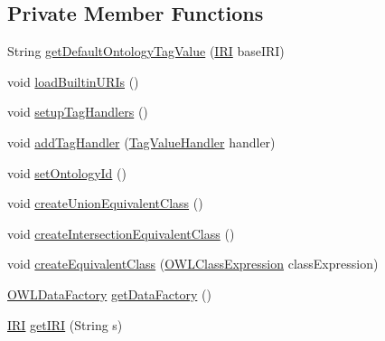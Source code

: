 \subsection*{Private Member Functions}
\begin{DoxyCompactItemize}
\item 
String \hyperlink{classorg_1_1coode_1_1owlapi_1_1obo_1_1parser_1_1_o_b_o_consumer_a778da28d999ef3418bc8a6edfb94684a}{get\-Default\-Ontology\-Tag\-Value} (\hyperlink{classorg_1_1semanticweb_1_1owlapi_1_1model_1_1_i_r_i}{I\-R\-I} base\-I\-R\-I)
\item 
void \hyperlink{classorg_1_1coode_1_1owlapi_1_1obo_1_1parser_1_1_o_b_o_consumer_ab49dd2aced1f66920170f474aa72d008}{load\-Builtin\-U\-R\-Is} ()
\item 
void \hyperlink{classorg_1_1coode_1_1owlapi_1_1obo_1_1parser_1_1_o_b_o_consumer_a14c95b9d7fd895a8048b2ee35b880ecb}{setup\-Tag\-Handlers} ()
\item 
void \hyperlink{classorg_1_1coode_1_1owlapi_1_1obo_1_1parser_1_1_o_b_o_consumer_a5700f0d0195a2ef14ef1d5ad0b40f8bb}{add\-Tag\-Handler} (\hyperlink{interfaceorg_1_1coode_1_1owlapi_1_1obo_1_1parser_1_1_tag_value_handler}{Tag\-Value\-Handler} handler)
\item 
void \hyperlink{classorg_1_1coode_1_1owlapi_1_1obo_1_1parser_1_1_o_b_o_consumer_a80d9a6b0b6ebd9c9b0cfac8179a642b3}{set\-Ontology\-Id} ()
\item 
void \hyperlink{classorg_1_1coode_1_1owlapi_1_1obo_1_1parser_1_1_o_b_o_consumer_a5454a80a318aa30f3a05dcd227dbf1b2}{create\-Union\-Equivalent\-Class} ()
\item 
void \hyperlink{classorg_1_1coode_1_1owlapi_1_1obo_1_1parser_1_1_o_b_o_consumer_aff723d6dd1fd77863a14f771646c3030}{create\-Intersection\-Equivalent\-Class} ()
\item 
void \hyperlink{classorg_1_1coode_1_1owlapi_1_1obo_1_1parser_1_1_o_b_o_consumer_ab9e1f0c5bbbb34285c6f553764f25cb4}{create\-Equivalent\-Class} (\hyperlink{interfaceorg_1_1semanticweb_1_1owlapi_1_1model_1_1_o_w_l_class_expression}{O\-W\-L\-Class\-Expression} class\-Expression)
\item 
\hyperlink{interfaceorg_1_1semanticweb_1_1owlapi_1_1model_1_1_o_w_l_data_factory}{O\-W\-L\-Data\-Factory} \hyperlink{classorg_1_1coode_1_1owlapi_1_1obo_1_1parser_1_1_o_b_o_consumer_a206d00bf8854f6847a49817b3d86cd60}{get\-Data\-Factory} ()
\item 
\hyperlink{classorg_1_1semanticweb_1_1owlapi_1_1model_1_1_i_r_i}{I\-R\-I} \hyperlink{classorg_1_1coode_1_1owlapi_1_1obo_1_1parser_1_1_o_b_o_consumer_ac17f826935eaee403a48f152670592d1}{get\-I\-R\-I} (String s)
\end{DoxyCompactItemize}
